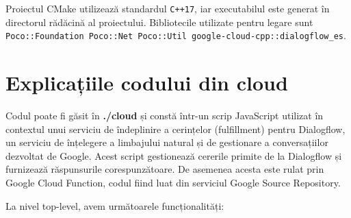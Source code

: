 Proiectul CMake utilizează standardul \texttt{C++17}, iar executabilul este generat în directorul rădăcină al proiectului. Bibliotecile utilizate pentru legare sunt \texttt{Poco::Foundation Poco::Net Poco::Util google-cloud-cpp::dialogflow\_es}.

\chapter{Explicațiile codului din cloud}

Codul poate fi găsit în \textbf{./cloud} și constă într-un scrip JavaScript utilizat în contextul unui serviciu de îndeplinire a cerințelor (fulfillment) pentru Dialogflow, un serviciu de înțelegere a limbajului natural și de gestionare a conversațiilor dezvoltat de Google. Acest script gestionează cererile primite de la Dialogflow și furnizează răspunsurile corespunzătoare. De asemenea acesta este rulat prin Google Cloud Function, codul fiind luat din serviciul Google Source Repository.

La nivel top-level, avem următoarele funcționalități:

